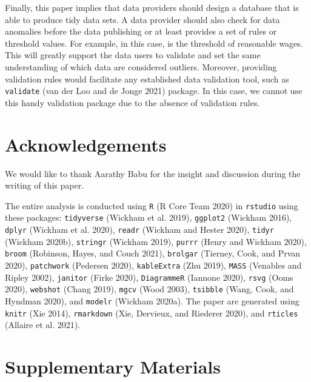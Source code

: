 \documentclass{article}
\begin{document}
Finally, this paper implies that data providers should design a database that is able to produce tidy data sets. A data provider should also check for data anomalies before the data publishing or at least provides a set of rules or threshold values. For example, in this case, is the threshold of reasonable wages. This will greatly support the data users to validate and set the same understanding of which data are considered outliers. Moreover, providing validation rules would facilitate any established data validation tool, such as \texttt{validate} (van der Loo and de Jonge 2021) package. In this case, we cannot use this handy validation package due to the absence of validation rules.

\hypertarget{acknowledgements}{%
\section{Acknowledgements}\label{acknowledgements}}

We would like to thank Aarathy Babu for the insight and discussion during the writing of this paper.

The entire analysis is conducted using \texttt{R} (R Core Team 2020) in \texttt{rstudio} using these packages: \texttt{tidyverse} (Wickham et al. 2019), \texttt{ggplot2} (Wickham 2016), \texttt{dplyr} (Wickham et al. 2020), \texttt{readr} (Wickham and Hester 2020), \texttt{tidyr} (Wickham 2020b), \texttt{stringr} (Wickham 2019), \texttt{purrr} (Henry and Wickham 2020), \texttt{broom} (Robinson, Hayes, and Couch 2021), \texttt{brolgar} (Tierney, Cook, and Prvan 2020), \texttt{patchwork} (Pedersen 2020), \texttt{kableExtra} (Zhu 2019), \texttt{MASS} (Venables and Ripley 2002), \texttt{janitor} (Firke 2020), \texttt{DiagrammeR} (Iannone 2020), \texttt{rsvg} (Ooms 2020), \texttt{webshot} (Chang 2019), \texttt{mgcv} (Wood 2003), \texttt{tsibble} (Wang, Cook, and Hyndman 2020), and \texttt{modelr} (Wickham 2020a). The paper are generated using \texttt{knitr} (Xie 2014), \texttt{rmarkdown} (Xie, Dervieux, and Riederer 2020), and \texttt{rticles} (Allaire et al. 2021).

\hypertarget{supplementary-materials}{%
\section{Supplementary Materials}\label{supplementary-materials}}
\end{document}
